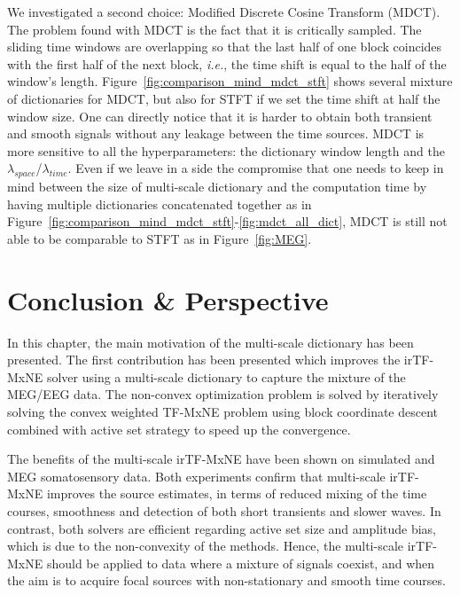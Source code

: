 We investigated a second choice: Modified Discrete Cosine Transform (MDCT). The problem found with MDCT is the fact that it is critically sampled. The sliding time windows are overlapping so that the last half of one block coincides with the first half of the next block, \textit{i.e.}, the time shift is equal to the half of the window's length. Figure~\ref{fig:comparison_mind_mdct_stft} shows several mixture of dictionaries for MDCT, but also for STFT if we set the time shift at half the window size. One can directly notice that it is harder to obtain both transient and smooth signals without any leakage between the time sources. MDCT is more sensitive to all the hyperparameters: the dictionary window length and the $\lambda_{space}$/$\lambda_{time}$. Even if we leave in a side the compromise that one needs to keep in mind between the size of multi-scale dictionary and the computation time by having multiple dictionaries concatenated together as in Figure~\ref{fig:comparison_mind_mdct_stft}-\ref{fig:mdct_all_dict}, MDCT is still not able to be comparable to STFT as in Figure~\ref{fig:MEG}.

\section{Conclusion \& Perspective}
In this chapter, the main motivation of the multi-scale dictionary has been presented. The first contribution has been presented which improves the irTF-MxNE solver using a multi-scale dictionary to capture the mixture of the MEG/EEG data. The non-convex optimization problem is solved by iteratively solving the convex weighted TF-MxNE problem using block coordinate descent combined with active set strategy to speed up the convergence.

The benefits of the multi-scale irTF-MxNE have been shown on simulated and MEG somatosensory data. Both experiments confirm that multi-scale irTF-MxNE improves the source estimates, in terms of reduced mixing of the time courses, smoothness and detection of both short transients and slower waves. In contrast, both solvers are efficient regarding active set size and amplitude bias, which is due to the non-convexity of the methods. Hence, the multi-scale irTF-MxNE should be applied to data where a mixture of signals coexist, and when the aim is to acquire focal sources with non-stationary and smooth time courses.


